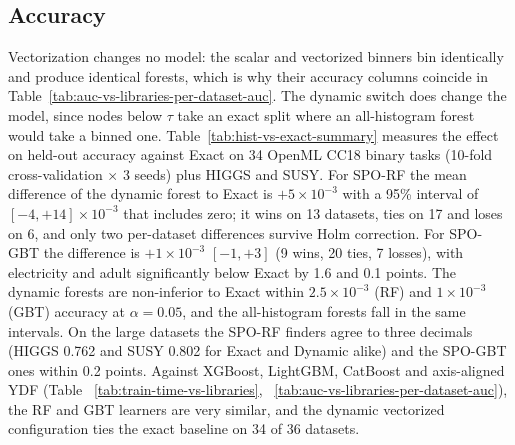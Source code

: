 \documentclass[sigconf,anonymous,review]{acmart}
\begin{document}




%
% 

\subsection{Accuracy}
\label{sec:res-accuracy}

Vectorization changes no model: the scalar and vectorized binners bin identically and produce identical forests, which is why their accuracy columns coincide in Table~\ref{tab:auc-vs-libraries-per-dataset-auc}. The dynamic switch does change the model, since nodes below $\tau$ take an exact split where an all-histogram forest would take a binned one. Table~\ref{tab:hist-vs-exact-summary} measures the effect on held-out accuracy against Exact on 34 OpenML CC18 binary tasks (10-fold cross-validation $\times$ 3 seeds) plus HIGGS and SUSY. For SPO-RF the mean difference of the dynamic forest to Exact is $+5\times10^{-3}$ with a 95\% interval of $[-4, +14]\times10^{-3}$ that includes zero; it wins on 13 datasets, ties on 17 and loses on 6, and only two per-dataset differences survive Holm correction. For SPO-GBT the difference is $+1\times10^{-3}$ $[-1, +3]$ (9 wins, 20 ties, 7 losses), with electricity and adult significantly below Exact by 1.6 and 0.1 points. The dynamic forests are non-inferior to Exact within $2.5\times10^{-3}$ (RF) and $1\times10^{-3}$ (GBT) accuracy at $\alpha=0.05$, and the all-histogram forests fall in the same intervals. On the large datasets the SPO-RF finders agree to three decimals (HIGGS 0.762 and SUSY 0.802 for Exact and Dynamic alike) and the SPO-GBT ones within 0.2 points. Against XGBoost, LightGBM, CatBoost and axis-aligned YDF (Table ~\ref{tab:train-time-vs-libraries}, ~\ref{tab:auc-vs-libraries-per-dataset-auc}), the RF and GBT learners are very similar, and the dynamic vectorized configuration ties the exact baseline on 34 of 36 datasets.
\end{document}
